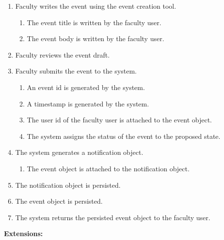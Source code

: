 \documentclass{article}
\begin{document}
    \begin{enumerate}
        \item Faculty writes the event using the event creation tool.
        \begin{enumerate}
            \item The event title is written by the faculty user.
            \item The event body is written by the faculty user.
        \end{enumerate}
        \item Faculty reviews the event draft.
        \item Faculty submits the event to the system.
        \begin{enumerate}
            \item An event id is generated by the system. 
            \item A timestamp is generated by the system.
            \item The user id of the faculty user is attached to the event object.
            \item The system assigns the status of the event to the proposed state. 
        \end{enumerate}
        \item The system generates a notification object.
        \begin{enumerate}
            \item The event object is attached to the notification object.
        \end{enumerate}
        \item The notification object is persisted.
        \item The event object is persisted.
        \item The system returns the persisted event object to the faculty user.
    \end{enumerate}
    \textbf{Extensions:}
\end{document}
